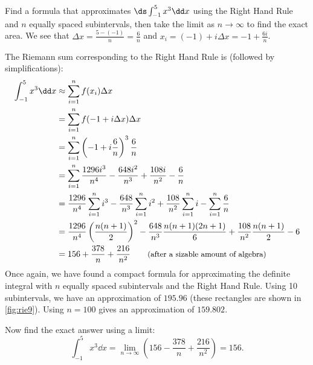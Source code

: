 \begin{example}\label{ex_rie10}
Find a formula that approximates $\ds\int_{-1}^5 x^3\dd x$ using the Right Hand Rule and $n$ equally spaced subintervals, then take the limit as $n\to\infty$ to find the exact area.
\solution
We see that %
$\Delta x = \frac{5-(-1)}{n} = \frac6n$ and $x_i = (-1) + i\Delta x=-1+\frac{6i}n$.

The Riemann sum corresponding to the Right Hand Rule is (followed by simplifications):
\begin{align*}
	\int_{-1}^5 x^3\dd x %
	&\approx \sum_{i=1}^n f(x_i)\Delta x \\
	&= \sum_{i=1}^n f(-1+i\Delta x)\Delta x \\
	&= \sum_{i=1}^n \left(-1+i\frac6n\right)^3\frac6n \\
	&= \sum_{i=1}^n \frac{1296 i^3}{n^4}-\frac{648 i^2}{n^3}+\frac{108 i}{n^2}-\frac6n \\
	&= \frac{1296}{n^4}\sum_{i=1}^n i^3 -\frac{648}{n^3}\sum_{i=1}^n i^2+\frac{108}{n^2}\sum_{i=1}^n i-\sum_{i=1}^n\frac6n \\
	&= \frac{1296}{n^4}\left(\frac{n(n+1)}{2}\right)^2 -\frac{648}{n^3}\frac{n(n+1)(2n+1)}{6}+\frac{108}{n^2}\frac{n(n+1)}{2}-6 \\
	&=156 + \frac{378}n + \frac{216}{n^2} \qquad\text{\small (after a sizable amount of algebra)}
\end{align*}
Once again, we have found a compact formula for approximating the definite integral with $n$ equally spaced subintervals and the Right Hand Rule. Using 10 subintervals, we have an approximation of $195.96$ (these rectangles are shown in \autoref{fig:rie9}). Using $n=100$ gives an approximation of $159.802$. 


Now find the exact answer using a limit:
\[
\int_{-1}^5 x^3\dd x
= \lim_{n\to\infty} \left(156 - \frac{378}n + \frac{216}{n^2}\right) = 156.
\]
\end{example}

